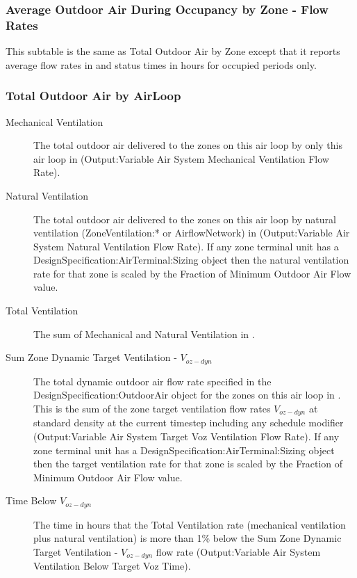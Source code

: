 \subsubsection{Average Outdoor Air During Occupancy by Zone - Flow Rates}\label{average-outdoor-air-during-occupancy-by-zone-flow-rates}
This subtable is the same as Total Outdoor Air by Zone except that it reports average flow rates in \si{\volumeFlowRate} and status times in hours for occupied periods only.

\subsubsection{Total Outdoor Air by AirLoop}\label{total-outdoor-air-by-airloop}
\begin{description}
  \item[Mechanical Ventilation] The total outdoor air delivered to the zones on this air loop by only this air loop in \si{\volume} (Output:Variable Air System Mechanical Ventilation Flow Rate).

  \item[Natural Ventilation] The total outdoor air delivered to the zones on this air loop by natural ventilation (ZoneVentilation:* or AirflowNetwork) in \si{\volume} (Output:Variable Air System Natural Ventilation Flow Rate). If any zone terminal unit has a DesignSpecification:AirTerminal:Sizing object then the natural ventilation rate for that zone is scaled by the Fraction of Minimum Outdoor Air Flow value.

  \item[Total Ventilation] The sum of Mechanical and Natural Ventilation in \si{\volume}.

  \item[Sum Zone Dynamic Target Ventilation - \(V_{oz-dyn}\)] The total dynamic outdoor air flow rate specified in the DesignSpecification:OutdoorAir object for the zones on this air loop in \si{\volumeFlowRate}. This is the sum of the zone target ventilation flow rates \(V_{oz-dyn}\) at standard density at the current timestep including any schedule modifier (Output:Variable Air System Target Voz Ventilation Flow Rate). If any zone terminal unit has a DesignSpecification:AirTerminal:Sizing object then the target ventilation rate for that zone is scaled by the Fraction of Minimum Outdoor Air Flow value.

  \item[Time Below \(V_{oz-dyn}\)] The time in hours that the Total Ventilation rate (mechanical ventilation plus natural ventilation) is more than 1\% below the Sum Zone Dynamic Target Ventilation - \(V_{oz-dyn}\) flow rate (Output:Variable Air System Ventilation Below Target Voz Time).


\end{description}
